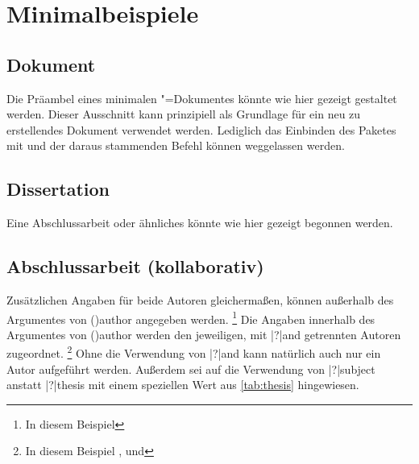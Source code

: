 \chapter{%
  Minimalbeispiele%
  \label{sec:exmpl}%
}
\section{%
  Dokument%
}

Die Präambel eines minimalen "=Dokumentes könnte wie hier 
gezeigt gestaltet werden. Dieser Ausschnitt kann prinzipiell als Grundlage für 
ein neu zu erstellendes Dokument verwendet werden. Lediglich das Einbinden des 
Paketes  mit  und der 
daraus stammenden Befehl  können weggelassen werden.



\section{%
  Dissertation%
  \label{sec:exmpl:dissertation}%
}

Eine Abschlussarbeit oder ähnliches könnte wie hier gezeigt begonnen werden.



\section{%
  Abschlussarbeit (kollaborativ)%
  \label{sec:exmpl:thesis}%
}

Zusätzlichen Angaben für beide Autoren gleichermaßen, können außerhalb des 
Argumentes von \Macro(){author} angegeben werden.%
\footnote{In diesem Beispiel }
Die Angaben innerhalb des Argumentes von \Macro(){author} 
werden den jeweiligen, mit \Macro|?|{and} getrennten Autoren zugeordnet.%
\footnote{%
  In diesem Beispiel ,  und 
}
Ohne die Verwendung von \Macro|?|{and} kann natürlich auch nur ein Autor 
aufgeführt werden. Außerdem sei auf die Verwendung von \Macro|?|{subject} 
anstatt \Macro|?|{thesis} mit einem speziellen Wert aus \autoref{tab:thesis} 
hingewiesen.



